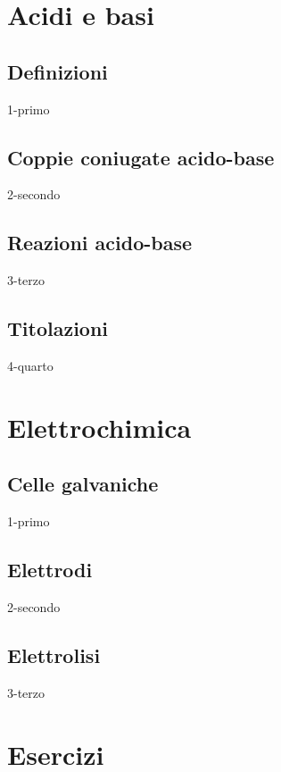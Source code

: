\documentclass[12pt]{book}%
\newcommand\blankpage{%
    \null
    \thispagestyle{empty}%
    \newpage}
\begin{document}
\chapter{Acidi e basi}

  \section{Definizioni}
    {1-primo}

  \section{Coppie coniugate acido-base}
    {2-secondo}

  \section{Reazioni acido-base}
    {3-terzo}

    \newpage

  \section{Titolazioni}
    {4-quarto}

\chapter{Elettrochimica}

  \section{Celle galvaniche}
    {1-primo}

  \section{Elettrodi}
    {2-secondo}

  \section{Elettrolisi}
    {3-terzo}

    \afterpage{\blankpage}
    \newpage
\appendix

\chapter{Esercizi}
\end{document}
